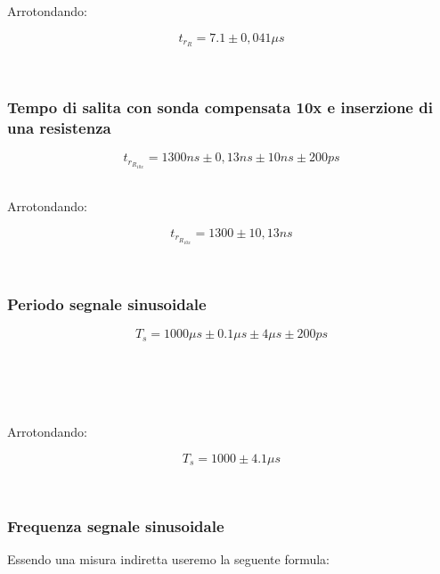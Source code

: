 \documentclass[a4paper]{article}
\begin{document}
Arrotondando: 

\begin{Large}
	\begin{equation}
		t_{r_R}= 7.1\pm 0,041 \mu s
	\end{equation}
\end{Large}\\

\subsubsection{Tempo di salita con sonda compensata 10x e inserzione di una resistenza}

\begin{Large}
	\begin{equation}
		{t_{r_{R_{10x}}}}= 1300ns \pm 0,13ns \pm10ns \pm200ps
	\end{equation}
\end{Large}\\

Arrotondando: 

\begin{Large}
	\begin{equation}
		{t_{r_{R_{10x}}}}= 1300\pm 10,13 ns
	\end{equation}
\end{Large}\\

\subsubsection{Periodo segnale sinusoidale}
\begin{Large}
	\begin{equation}
  		{T_s}= 1000\mu s\pm 0.1 \mu s \pm4 \mu s \pm200ps
	\end{equation}
\end{Large}\\
\\
\\
\\

Arrotondando: 

\begin{Large}
	\begin{equation}
		{T_s}= 1000 \pm 4.1\mu s 
	\end{equation}
\end{Large}\\


\subsubsection{Frequenza segnale sinusoidale}
Essendo una misura indiretta useremo la seguente formula:
\end{document}

